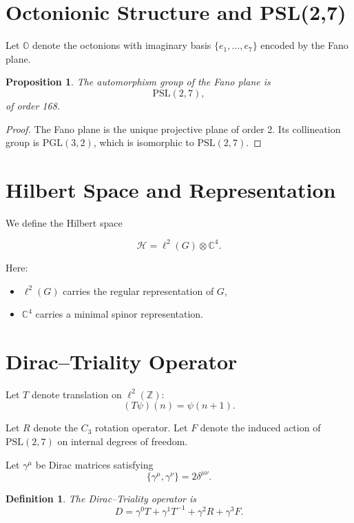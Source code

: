 \documentclass[11pt]{article}
\newtheorem{definition}{Definition}
\newtheorem{proposition}{Proposition}
\begin{document}
	\section{Octonionic Structure and PSL(2,7)}
	
	Let $\mathbb O$ denote the octonions with imaginary basis
	$\{e_1,\dots,e_7\}$ encoded by the Fano plane.
	
	\begin{proposition}
		The automorphism group of the Fano plane is
		\[
		\mathrm{PSL}(2,7),
		\]
		of order 168.
	\end{proposition}
	
	\begin{proof}
		The Fano plane is the unique projective plane of order 2.
		Its collineation group is $\mathrm{PGL}(3,2)$,
		which is isomorphic to $\mathrm{PSL}(2,7)$.
	\end{proof}
	
	\section{Hilbert Space and Representation}
	
	We define the Hilbert space
	
	\[
	\mathcal H = \ell^2(G) \otimes \mathbb C^4.
	\]
	
	Here:
	
	\begin{itemize}
		\item $\ell^2(G)$ carries the regular representation of $G$,
		\item $\mathbb C^4$ carries a minimal spinor representation.
	\end{itemize}
	
	\section{Dirac--Triality Operator}
	
	Let $T$ denote translation on $\ell^2(\mathbb Z)$:
	\[
	(T\psi)(n) = \psi(n+1).
	\]
	
	Let $R$ denote the $C_3$ rotation operator.
	Let $F$ denote the induced action of $\mathrm{PSL}(2,7)$
	on internal degrees of freedom.
	
	Let $\gamma^\mu$ be Dirac matrices satisfying
	\[
	\{\gamma^\mu,\gamma^\nu\} = 2\delta^{\mu\nu}.
	\]
	
	\begin{definition}
		The Dirac--Triality operator is
		\[
		D = \gamma^0 T + \gamma^1 T^{-1}
		+ \gamma^2 R + \gamma^3 F.
		\]
	\end{definition}
	
\end{document}
